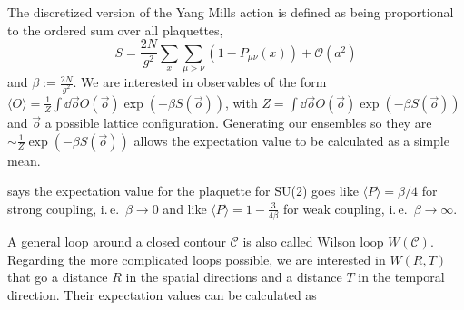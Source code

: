 \documentclass[%
 reprint,
 amsmath,amssymb,
 aps,
]{revtex4-1}
\renewcommand{\Re}{\operatorname{Re}}
\begin{document}
The discretized version of the Yang Mills action is defined as being proportional to the ordered sum over all plaquettes, \[S=\frac{2N}{g^2}\sum_{x}\sum_{\mu>\nu}\left(1-P_{\mu\nu}(x)\right)+\mathcal{O}(a^2)\]
and $\beta:=\frac{2N}{g^2}$. We are interested in observables of the form $\langle O\rangle=\frac{1}{Z}\int \dd \vec{o} O(\vec{o}) \exp(-\beta S(\vec{o}))$, with $ Z=\int \dd \vec{o} O(\vec{o}) \exp(-\beta S(\vec{o}))$ and $\vec{o}$ a possible lattice configuration. Generating our ensembles so they are $\sim \frac{1}{Z} \exp(-\beta S(\vec{o}))$ allows the expectation value to be calculated as a simple mean.

\citet{creutzsu2} says the expectation value for the plaquette for SU(2) goes like $\langle P \rangle=\beta/4$ for strong coupling, i.\,e.\, $\beta\to 0$ and like $\langle P \rangle =1-\frac{3}{4\beta}$ for weak coupling, i.\,e.\, $\beta\to \infty$.


%
%


A general loop around a closed contour $\mathcal{C}$ is also called Wilson loop $W(\mathcal{C})$. Regarding the more complicated loops possible, we are interested in $W(R,  T)$ that go a distance $R$ in the spatial directions and a distance $T$ in the temporal direction. Their expectation values can be calculated as 
\end{document}
